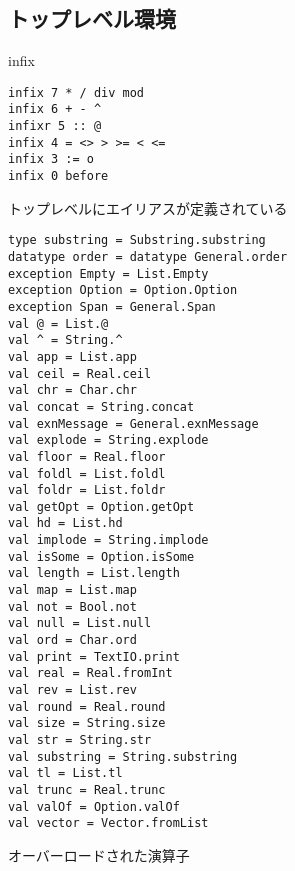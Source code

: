 \documentclass{jbook}
\begin{document}
{\Exceptions


\Functions

\val{=}{[''a.~''a * ''a -> bool]}
\val{<>}{[''a.~''a * ''a -> bool]}
\val{!}{['a.~'a ref -> 'a]}

\subsection{トップレベル環境}

infix
\begin{verbatim}
infix 7 * / div mod
infix 6 + - ^
infixr 5 :: @
infix 4 = <> > >= < <=
infix 3 := o
infix 0 before
\end{verbatim}

トップレベルにエイリアスが定義されている

\begin{verbatim}
type substring = Substring.substring
datatype order = datatype General.order
exception Empty = List.Empty
exception Option = Option.Option
exception Span = General.Span
val @ = List.@
val ^ = String.^
val app = List.app
val ceil = Real.ceil
val chr = Char.chr
val concat = String.concat
val exnMessage = General.exnMessage
val explode = String.explode
val floor = Real.floor
val foldl = List.foldl
val foldr = List.foldr
val getOpt = Option.getOpt
val hd = List.hd
val implode = String.implode
val isSome = Option.isSome
val length = List.length
val map = List.map
val not = Bool.not
val null = List.null
val ord = Char.ord
val print = TextIO.print
val real = Real.fromInt
val rev = List.rev
val round = Real.round
val size = String.size
val str = String.str
val substring = String.substring
val tl = List.tl
val trunc = Real.trunc
val valOf = Option.valOf
val vector = Vector.fromList
\end{verbatim}

オーバーロードされた演算子

}
\end{document}
